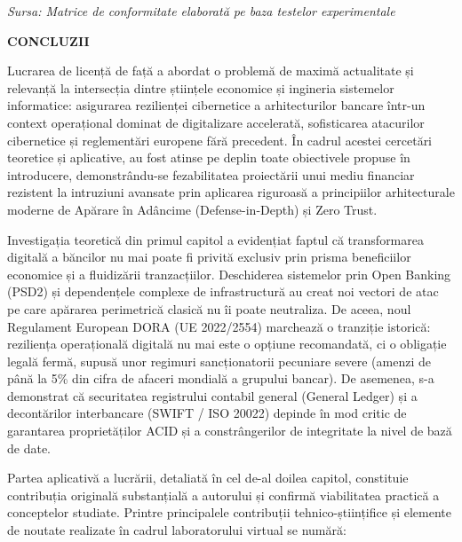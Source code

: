 \documentclass[
]{article}
\begin{document}
\emph{Sursa: Matrice de conformitate elaborată pe baza testelor
experimentale}

\textbf{CONCLUZII}

Lucrarea de licență de față a abordat o problemă de maximă actualitate
și relevanță la intersecția dintre științele economice și ingineria
sistemelor informatice: asigurarea rezilienței cibernetice a
arhitecturilor bancare într-un context operațional dominat de
digitalizare accelerată, sofisticarea atacurilor cibernetice și
reglementări europene fără precedent. În cadrul acestei cercetări
teoretice și aplicative, au fost atinse pe deplin toate obiectivele
propuse în introducere, demonstrându-se fezabilitatea proiectării unui
mediu financiar rezistent la intruziuni avansate prin aplicarea
riguroasă a principiilor arhitecturale moderne de Apărare în Adâncime
(Defense-in-Depth) și Zero Trust.

Investigația teoretică din primul capitol a evidențiat faptul că
transformarea digitală a băncilor nu mai poate fi privită exclusiv prin
prisma beneficiilor economice și a fluidizării tranzacțiilor.
Deschiderea sistemelor prin Open Banking (PSD2) și dependențele complexe
de infrastructură au creat noi vectori de atac pe care apărarea
perimetrică clasică nu îi poate neutraliza. De aceea, noul Regulament
European DORA (UE 2022/2554) marchează o tranziție istorică: reziliența
operațională digitală nu mai este o opțiune recomandată, ci o obligație
legală fermă, supusă unor regimuri sancționatorii pecuniare severe
(amenzi de până la 5\% din cifra de afaceri mondială a grupului bancar).
De asemenea, s-a demonstrat că securitatea registrului contabil general
(General Ledger) și a decontărilor interbancare (SWIFT / ISO 20022)
depinde în mod critic de garantarea proprietăților ACID și a
constrângerilor de integritate la nivel de bază de date.

Partea aplicativă a lucrării, detaliată în cel de-al doilea capitol,
constituie contribuția originală substanțială a autorului și confirmă
viabilitatea practică a conceptelor studiate. Printre principalele
contribuții tehnico-științifice și elemente de noutate realizate în
cadrul laboratorului virtual se numără:
\end{document}
